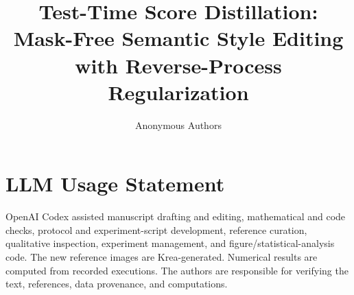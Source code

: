 \documentclass[10pt,twocolumn,letterpaper]{article}
\title{Test-Time Score Distillation: Mask-Free Semantic Style Editing with Reverse-Process Regularization}
\author{Anonymous Authors}
\begin{document}
\maketitle






\section*{LLM Usage Statement}
OpenAI Codex assisted manuscript drafting and editing, mathematical and
code checks, protocol and experiment-script development, reference
curation, qualitative inspection, experiment management, and
figure/statistical-analysis code. The new reference images are
Krea-generated. Numerical results are computed from recorded executions.
The authors are responsible for verifying the text, references, data
provenance, and computations.
{\small}
\end{document}
